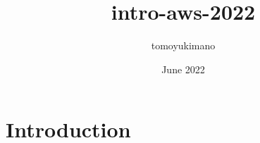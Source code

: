\documentclass{article}
\title{intro-aws-2022}
\author{tomoyukimano }
\date{June 2022}
\begin{document}
\maketitle

\section{Introduction}
\end{document}
